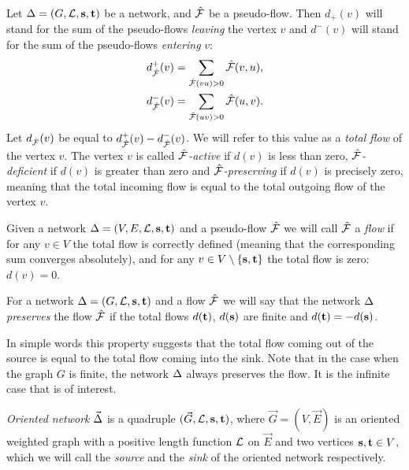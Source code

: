 \documentclass[12pt,oneside,a4paper]{amsart}
\begin{document}
      \begin{definition}
        Let $\Delta = (G, \mathcal{L}, \mathbf{s}, \mathbf{t})$ be a network, and $\mathcal{\hat{F}}$ be a pseudo-flow.
        Then $d_{+}(v)$ will stand for the sum of the pseudo-flows \emph{leaving} the vertex $v$ and
        $d^{-}(v)$ will stand for the sum of the pseudo-flows \emph{entering} $v$:
        \begin{align*}
          &d^{+}_{\mathcal{\hat{F}}}(v) = \sum_{\mathcal{\hat{F}}(vu) > 0} \mathcal{\hat{F}}(v,u),\\
          &d^{-}_{\mathcal{\hat{F}}}(v) = \sum_{\mathcal{\hat{F}}(uv) > 0} \mathcal{\hat{F}}(u,v).
        \end{align*}
        Let $d_{\mathcal{\hat{F}}}(v)$ be equal to $d^{+}_{\mathcal{\hat{F}}}(v) - d^{-}_{\mathcal{\hat{F}}}(v)$.
        We will refer to this value as a \emph{total flow} of the vertex $v$.
        The vertex $v$ is called \emph{$\mathcal{\hat{F}}$-active} if $d(v)$ is less than zero,
          \emph{$\mathcal{\hat{F}}$-deficient} if $d(v)$ is greater than zero and
          \emph{$\mathcal{\hat{F}}$-preserving} if $d(v)$ is precisely zero, meaning that the total incoming flow
          is equal to the total outgoing flow of the vertex $v$.
      \end{definition}
      \begin{definition}
        \label{flow-dfn}
        Given a network $\Delta = (V, E, \mathcal{L}, \mathbf{s}, \mathbf{t})$ and a pseudo-flow $\mathcal{\hat{F}}$ we will call $\mathcal{\hat{F}}$ a
          \emph{flow} if for any $v \in V$ the total flow is correctly defined (meaning that the corresponding sum converges absolutely),
          and for any $v \in V \setminus \{\mathbf{s}, \mathbf{t}\}$ the total flow is zero: $d(v) = 0$.
      \end{definition}
      \begin{definition}
        \label{flow-preserving-dfn}
        For a network $\Delta = (G, \mathcal{L}, \mathbf{s}, \mathbf{t})$ and a flow $\mathcal{\hat{F}}$ we will say
          that the network $\Delta$ \emph{preserves} the flow $\mathcal{\hat{F}}$ if the total flows $d(\mathbf{t})$, $d(\mathbf{s})$ are finite
          and $d(\mathbf{t}) = -d(\mathbf{s})$.
      \end{definition}
      \begin{remark}
        In simple words this property suggests that the total flow coming out of the source is equal to the total flow
          coming into the sink.
        Note that in the case when the graph $G$ is finite, the network $\Delta$ always preserves the flow.
        It is the infinite case that is of interest.
      \end{remark}
      \begin{definition}
        \emph{Oriented network} $\vec{\Delta}$ is a quadruple $(\vec{G}, \mathcal{L}, \mathbf{s}, \mathbf{t})$, where
          $\vec{G} = (V, \vec{E})$ is an oriented weighted graph with
          a positive length function $\mathcal{L}$ on $\vec{E}$ and two vertices $\mathbf{s}, \mathbf{t} \in V$, which
          we will call the \emph{source} and the \emph{sink} of the oriented network respectively.
      \end{definition}
\end{document}

